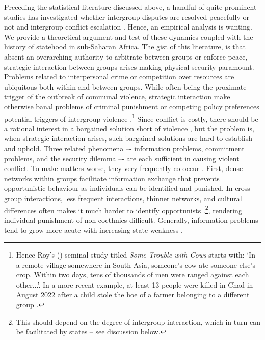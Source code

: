 Preceding the statistical literature discussed above, a handful of quite
prominent studies has investigated whether intergroup disputes are resolved
peacefully or not and intergroup conflict escalation
\citep{Fearon_1996,Lake_1996, Fearon1995}. Hence, an empirical analysis is
wanting. We provide a theoretical argument and test of these dynamics coupled
with the history of statehood in sub-Saharan Africa. The gist of this
literature, is that absent an overarching authority to arbitrate between groups
or enforce peace, strategic interaction between groups arises making physical
security paramount. Problems related to interpersonal crime or competition over
resources are ubiquitous both within and between groups. While often being the
proximate trigger of the outbreak of communal violence, strategic interaction
make otherwise banal problems of criminal punishment or competing policy
preferences potential triggers of intergroup violence \citep{diamond2013world,
	Eaton_2008, Fearon1995, Fearon_1996, Lake_1996}.\footnote{Hence Roy's
		(\citeyear[1]{roy1994some}) seminal study titled \textit{Some
		Trouble with Cows} starts with: `In a remote village somewhere
		in South Asia, someone's cow ate someone else's crop. Within two
		days, tens of thousands of men were ranged against each
		other...'. In a more recent example, at least 13 people were
	killed in Chad in August 2022 after a child stole the hoe of a farmer
belonging to a different group \citep{NRK2022}.} Since conflict is costly, there
should be a rational interest in a bargained solution short of violence
\citep{Fearon1995}, but the problem is, when strategic interaction arises, such
bargained solutions are hard to establish and uphold. Three related phenomena –-
information problems, commitment problems, and the security dilemma –- are each
sufficient in causing violent conflict. To make matters worse, they very
frequently co-occur \citep[46]{Lake_1996}. First, dense networks within groups
facilitate information exchange that prevents opportunistic behaviour as
individuals can be identified and punished. In cross-group interactions, less
frequent interactions, thinner networks, and cultural differences often makes it
much harder to identify opportunists \citep[719]{Fearon_1996}.\footnote{This
should depend on the degree of intergroup interaction, which in turn can be
facilitated by states – see discussion below.}, rendering individual punishment
of non-coethnics difficult. Generally, information problems tend to grow more
acute with increasing state weakness \citep[46]{Fearon1995, Lake_1996}.

